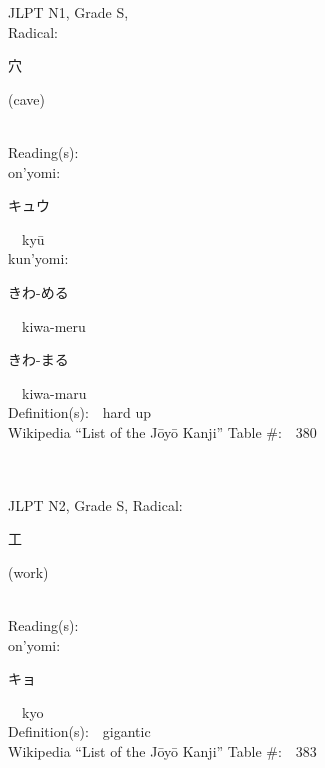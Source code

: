 \begin{multicols}{2}
{JLPT N1, Grade S, \\Radical:\ \ {\begin{CJK}{UTF8}{min} 穴 \end{CJK}} (cave) } \\
Reading(s):\ \ \\
{\hspace*{1em}}on'yomi:\ \ \\
{\hspace*{2em}}{\begin{CJK}{UTF8}{min} キュウ \end{CJK}}\ \ ky\=u\ \ \\
{\hspace*{1em}}kun'yomi:\ \ \\
{\hspace*{2em}}{\begin{CJK}{UTF8}{min} きわ-める \end{CJK}}\ \ kiwa-meru\ \ \\
{\hspace*{2em}}{\begin{CJK}{UTF8}{min} きわ-まる \end{CJK}}\ \ kiwa-maru\ \ \\
Definition(s):\ \ hard up \\
Wikipedia ``List of the J\=oy\=o Kanji'' Table \#:\ \ 380 \\
\ \ \\
{\fontsize{34pt}{40pt}  }\ \ \\  %
{JLPT N2, Grade S, Radical:\ \ {\begin{CJK}{UTF8}{min} 工 \end{CJK}} (work) } \\
Reading(s):\ \ \\
{\hspace*{1em}}on'yomi:\ \ \\
{\hspace*{2em}}{\begin{CJK}{UTF8}{min} キョ \end{CJK}}\ \ kyo\ \ \\
Definition(s):\ \ gigantic \\
Wikipedia ``List of the J\=oy\=o Kanji'' Table \#:\ \ 383 \\
\ \ \\
{\fontsize{34pt}{40pt}  }\ \ \\

\end{multicols}
